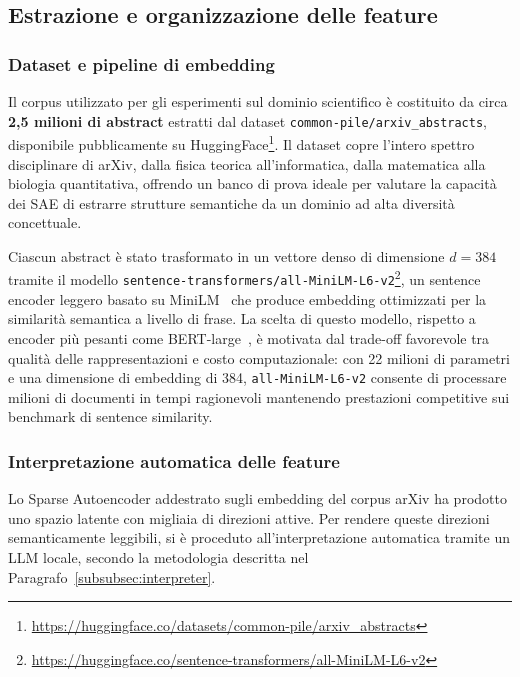 \subsection{Estrazione e organizzazione delle feature}
\label{subsec:feature_extraction_results}

\subsubsection{Dataset e pipeline di embedding}
\label{subsubsec:dataset_embedding}
Il corpus utilizzato per gli esperimenti sul dominio scientifico è costituito da circa \textbf{2,5 milioni di abstract} estratti dal dataset \texttt{common-pile/arxiv\_abstracts}, disponibile pubblicamente su HuggingFace\footnote{\url{https://huggingface.co/datasets/common-pile/arxiv_abstracts}}. Il dataset copre l'intero spettro disciplinare di arXiv, dalla fisica teorica all'informatica, dalla matematica alla biologia quantitativa, offrendo un banco di prova ideale per valutare la capacità dei SAE di estrarre strutture semantiche da un dominio ad alta diversità concettuale.

Ciascun abstract è stato trasformato in un vettore denso di dimensione $d = 384$ tramite il modello \texttt{sentence-transformers/all-MiniLM-L6-v2}\footnote{\url{https://huggingface.co/sentence-transformers/all-MiniLM-L6-v2}}, un sentence encoder leggero basato su MiniLM~\parencite{wang2020minilm} che produce embedding ottimizzati per la similarità semantica a livello di frase. La scelta di questo modello, rispetto a encoder più pesanti come BERT-large~\parencite{devlin2018bert}, è motivata dal trade-off favorevole tra qualità delle rappresentazioni e costo computazionale: con 22 milioni di parametri e una dimensione di embedding di 384, \texttt{all-MiniLM-L6-v2} consente di processare milioni di documenti in tempi ragionevoli mantenendo prestazioni competitive sui benchmark di sentence similarity.

\subsubsection{Interpretazione automatica delle feature}
\label{subsubsec:feature_interpretation}
Lo Sparse Autoencoder addestrato sugli embedding del corpus arXiv ha prodotto uno spazio latente con migliaia di direzioni attive. Per rendere queste direzioni semanticamente leggibili, si è proceduto all'interpretazione automatica tramite un LLM locale, secondo la metodologia descritta nel Paragrafo~\ref{subsubsec:interpreter}.

